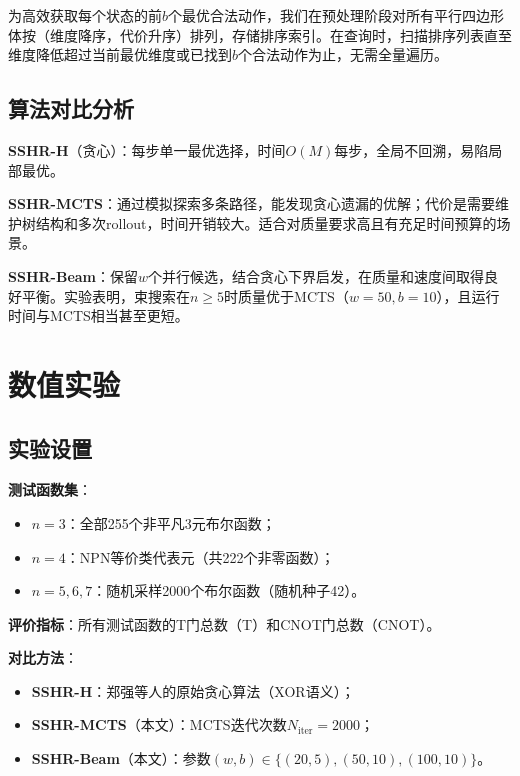 \documentclass[10.5pt,compsoc,UTF8]{CjC}
\theoremstyle{mystyle}
\begin{document}
为高效获取每个状态的前$b$个最优合法动作，我们在预处理阶段对所有平行四边形体按（维度降序，代价升序）排列，存储排序索引。在查询时，扫描排序列表直至维度降低超过当前最优维度或已找到$b$个合法动作为止，无需全量遍历。

\subsection{\heiti 算法对比分析}

\textbf{SSHR-H}（贪心）：每步单一最优选择，时间$O(M)$每步，全局不回溯，易陷局部最优。

\textbf{SSHR-MCTS}：通过模拟探索多条路径，能发现贪心遗漏的优解；代价是需要维护树结构和多次rollout，时间开销较大。适合对质量要求高且有充足时间预算的场景。

\textbf{SSHR-Beam}：保留$w$个并行候选，结合贪心下界启发，在质量和速度间取得良好平衡。实验表明，束搜索在$n\ge5$时质量优于MCTS（$w{=}50,b{=}10$），且运行时间与MCTS相当甚至更短。


\section{\heiti 数值实验}

\subsection{\heiti 实验设置}

\textbf{测试函数集}：
\begin{itemize}[noitemsep]
    \item $n=3$：全部255个非平凡3元布尔函数；
    \item $n=4$：NPN等价类代表元（共222个非零函数）；
    \item $n=5,6,7$：随机采样2000个布尔函数（随机种子42）。
\end{itemize}

\textbf{评价指标}：所有测试函数的T门总数（T）和CNOT门总数（CNOT）。

\textbf{对比方法}：
\begin{itemize}[noitemsep]
    \item \textbf{SSHR-H}：郑强等人\cite{zheng2025cnot}的原始贪心算法（XOR语义）；
    \item \textbf{SSHR-MCTS}（本文）：MCTS迭代次数$N_{\text{iter}}=2000$；
    \item \textbf{SSHR-Beam}（本文）：参数$(w,b)\in\{(20,5),(50,10),(100,10)\}$。
\end{itemize}
\end{document}
